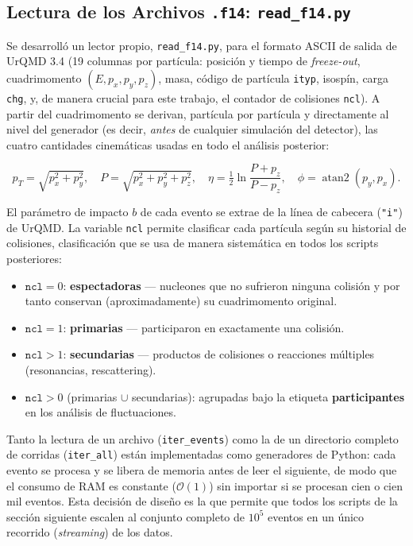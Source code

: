 \subsection{Lectura de los Archivos \texttt{.f14}: \texttt{read\_f14.py}}
\label{sec:read_f14}

\noindent
Se desarrolló un lector propio, \texttt{read\_f14.py}, para el formato ASCII
de salida de UrQMD 3.4 (19 columnas por partícula: posición y tiempo de
\textit{freeze-out}, cuadrimomento $(E,p_x,p_y,p_z)$, masa, código de
partícula \texttt{ityp}, isospín, carga \texttt{chg}, y, de manera crucial
para este trabajo, el contador de colisiones \texttt{ncl}). A partir del
cuadrimomento se derivan, partícula por partícula y directamente al nivel
del generador (es decir, \emph{antes} de cualquier simulación del detector),
las cuatro cantidades cinemáticas usadas en todo el análisis posterior:

\begin{equation}
    p_T=\sqrt{p_x^2+p_y^2},\quad
    P=\sqrt{p_x^2+p_y^2+p_z^2},\quad
    \eta=\tfrac{1}{2}\ln\!\frac{P+p_z}{P-p_z},\quad
    \phi=\operatorname{atan2}(p_y,p_x).
\end{equation}

\noindent
El parámetro de impacto $b$ de cada evento se extrae de la línea de
cabecera (\texttt{"i"}) de UrQMD. La variable \texttt{ncl} permite
clasificar cada partícula según su historial de colisiones, clasificación
que se usa de manera sistemática en todos los scripts posteriores:

\begin{itemize}
    \item $\texttt{ncl}=0$: \textbf{espectadoras} — nucleones que no sufrieron
    ninguna colisión y por tanto conservan (aproximadamente) su cuadrimomento
    original.
    \item $\texttt{ncl}=1$: \textbf{primarias} — participaron en exactamente
    una colisión.
    \item $\texttt{ncl}>1$: \textbf{secundarias} — productos de colisiones o
    reacciones múltiples (resonancias, rescattering).
    \item $\texttt{ncl}>0$ (primarias $\cup$ secundarias): agrupadas bajo la
    etiqueta \textbf{participantes} en los análisis de fluctuaciones.
\end{itemize}

\noindent
Tanto la lectura de un archivo (\texttt{iter\_events}) como la de un
directorio completo de corridas (\texttt{iter\_all}) están implementadas
como generadores de Python: cada evento se procesa y se libera de memoria
antes de leer el siguiente, de modo que el consumo de RAM es constante
($\mathcal{O}(1)$) sin importar si se procesan cien o cien mil eventos. Esta
decisión de diseño es la que permite que todos los scripts de la sección
siguiente escalen al conjunto completo de $10^{5}$ eventos en un único
recorrido (\textit{streaming}) de los datos.

